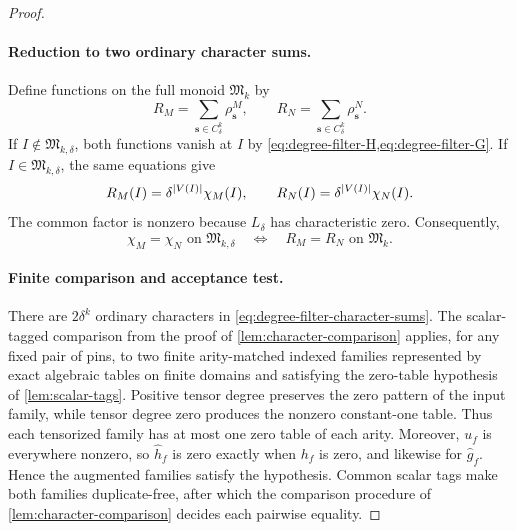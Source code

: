 \documentclass[11pt]{article}
\theoremstyle{plain}
\theoremstyle{definition}
\theoremstyle{remark}
\newcommand{\InstMonoid}[1]{\mathfrak M_{#1}}
\DeclarePairedDelimiter{\abs}{\lvert}{\rvert}
\begin{document}
\begin{proof}
\paragraph{Reduction to two ordinary character sums.}
Define functions on the full monoid $\InstMonoid{k}$ by
\begin{equation}
  R_M=\sum_{\mathbf s\in C_\delta^k}\rho^M_{\mathbf s},
  \qquad
  R_N=\sum_{\mathbf s\in C_\delta^k}\rho^N_{\mathbf s}.
  \label{eq:degree-filter-character-sums}
\end{equation}
If $I\notin\mathfrak M_{k,\delta}$, both functions vanish at $I$ by
\cref{eq:degree-filter-H,eq:degree-filter-G}.  If
$I\in\mathfrak M_{k,\delta}$, the same equations give
\[
  R_M(I)=\delta^{\abs{V(I)}}\chi_M(I),
  \qquad
  R_N(I)=\delta^{\abs{V(I)}}\chi_N(I).
\]
The common factor is nonzero because $L_\delta$ has characteristic zero.
Consequently,
\begin{equation}
  \chi_M=\chi_N\text{ on }\mathfrak M_{k,\delta}
  \quad\Longleftrightarrow\quad
  R_M=R_N\text{ on }\InstMonoid{k}.
  \label{eq:degree-filter-reduction}
\end{equation}

\paragraph{Finite comparison and acceptance test.}
There are $2\delta^k$ ordinary characters in
\eqref{eq:degree-filter-character-sums}.  The scalar-tagged comparison from
the proof of \cref{lem:character-comparison} applies, for any fixed pair
of pins, to two finite arity-matched indexed families represented by exact
algebraic tables on finite domains and satisfying the zero-table hypothesis
of \cref{lem:scalar-tags}.  Positive tensor degree preserves the zero pattern
of the input family, while tensor degree zero produces the nonzero
constant-one table.  Thus each tensorized family has at most one zero table
of each arity.  Moreover, $u_f$ is everywhere nonzero, so $\widehat h_f$ is
zero exactly when $h_f$ is zero, and likewise for $\widehat g_f$.  Hence the
augmented families satisfy the hypothesis.  Common scalar tags make both
families duplicate-free, after which the comparison procedure of
\cref{lem:character-comparison} decides each pairwise equality.


\end{proof}
\end{document}
